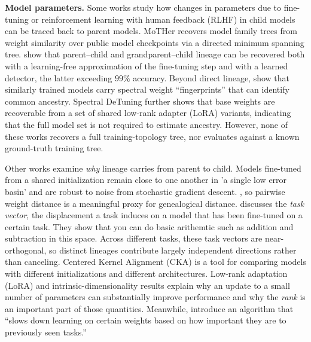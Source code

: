 \documentclass{article}
\theoremstyle{definition}
\theoremstyle{plain}
\begin{document}
\textbf{Model parameters.} Some works study how changes in parameters due to fine-tuning or
reinforcement learning with human feedback (RLHF) in child models can be traced back to parent
models. MoTHer \citep{horwitz2024mother} recovers model family trees from weight similarity over
public model checkpoints via a directed minimum spanning tree. \citet{yu2025neural} show that
parent--child and grandparent--child lineage can be recovered both with a learning-free approximation
of the fine-tuning step and with a learned detector, the latter exceeding $99\%$ accuracy. Beyond
direct lineage, \citet{ghostspec2025} show that similarly trained models carry spectral weight
``fingerprints'' that can identify common ancestry. Spectral DeTuning \citep{horwitz2024spectral}
further shows that base weights are recoverable from a set of shared low-rank adapter (LoRA)
variants, indicating that the full model set is not required to estimate ancestry. However, none of
these works recovers a full training-topology tree, nor evaluates against a known ground-truth
training tree.

Other works examine \emph{why} lineage carries from parent to
child. Models fine-tuned from a shared initialization remain close to one another in 'a single low error basin' and are robust to noise from stochastic gradient descent.
\citep{neyshabur2020,wortsman2022model,frankle2020linear}, so pairwise weight distance is a meaningful proxy for
genealogical distance. \citep{ilharco2023editing} discusses the \textit{task vector}, the displacement a task induces on a model that has been fine-tuned on a certain task.  They show that you can do basic arithemtic such as addition and subtraction in this space.  Across different tasks, these task vectors are near-orthogonal, so
distinct lineages contribute largely independent directions rather than canceling. Centered Kernel
Alignment (CKA) \citep{kornblith2019similarity} is a tool for comparing models with different initializations and different architectures. Low-rank adaptation (LoRA) \citep{hu2022lora} and
intrinsic-dimensionality results \citep{aghajanyan2021intrinsic} explain why an update to a small number of parameters can substantially improve performance
and why the \emph{rank} is an important part of those quantities. Meanwhile, \citep{kirkpatrick2017overcoming} introduce an algorithm that ``slows down learning on certain weights based on how important they are to previously seen tasks.''  
\end{document}
